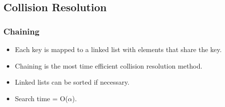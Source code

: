 \documentclass{report}
\begin{document}
\subsection{Collision Resolution}
\subsubsection{Chaining}
\begin{itemize}
\item Each key is mapped to a linked list with elements that share the key.
\item Chaining is the most time efficient collision resolution method.
\item Linked lists can be sorted if necessary.
\item Search time = O($\alpha$).
\end{itemize}
\end{document}
